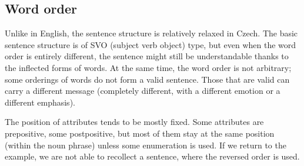 \subsection{Word order}
Unlike in English, the sentence structure is relatively relaxed in Czech. The basic sentence structure is of SVO (subject verb object) type, but even when the word order is entirely different, the sentence might still be understandable thanks to the inflected forms of words. At the same time, the word order is not arbitrary; some orderings of words do not form a valid sentence. Those that are valid can carry a different message (completely different, with a different emotion or a different emphasis).

The position of attributes tends to be mostly fixed. Some attributes are prepositive, some postpositive, but most of them stay at the same position (within the noun phrase) unless some enumeration is used. If we return to the  example, we are not able to recollect a sentence, where the reversed order is used.

